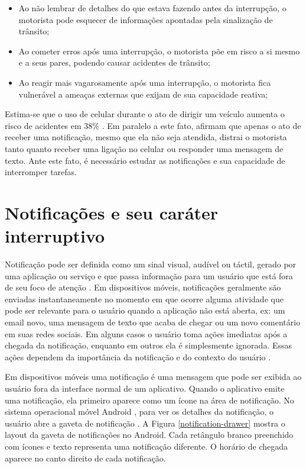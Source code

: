 \begin{itemize}
  \item Ao não lembrar de detalhes do que estava fazendo antes da interrupção, o motorista pode esquecer de informações
  apontadas pela sinalização de trânsito;
  \item Ao cometer erros após uma interrupção, o motorista põe em risco a si mesmo e a seus pares, podendo causar acidentes
  de trânsito;
  \item Ao reagir mais vagarosamente após uma interrupção, o motorista fica vulnerável a ameaças externas que exijam de sua
  capacidade reativa;
\end{itemize}

Estima-se que o uso de celular durante o ato de dirigir um veículo aumenta o risco de acidentes em 38\% \cite{laberge2001wireless}.
Em paralelo a este fato,  afirmam que apenas o ato de receber uma notificação, mesmo que ela não seja
atendida, distrai o motorista tanto quanto receber uma ligação no celular ou responder uma mensagem de texto. Ante este fato, é
necessário estudar as notificações e sua capacidade de interromper tarefas.

\section{Notificações e seu caráter interruptivo}
\label{notificacao}

Notificação pode ser definida como um sinal visual, audível ou táctil, gerado por uma aplicação
ou serviço e que passa informação para um usuário que está fora de seu foco de atenção \cite{iqbal2010notifications}.
Em dispositivos móveis, notificações geralmente são enviadas instantaneamente no momento em que ocorre alguma atividade que pode ser relevante
para o usuário quando a aplicação não está aberta, ex: um email novo, uma mensagem de texto que acaba de chegar ou um
novo comentário em suas redes sociais. Em alguns casos o usuário toma ações imediatas após a chegada da notificação,
enquanto em outros ela é simplesmente ignorada. Essas ações dependem da importância da notificação e do contexto do
usuário \cite{sahami2014large}.

Em dispositivos móveis uma notificação é uma mensagem que pode ser exibida ao usuário fora da interface normal de um aplicativo.
Quando o aplicativo emite uma notificação, ela primeiro aparece como um ícone na área de notificação. No sistema operacional móvel
Android \cite{android}, para ver os detalhes da notificação, o usuário abre a gaveta de notificação \cite{notificationDrawer}. A Figura
\ref{notification-drawer} mostra o layout da gaveta de notificações no Android. Cada retângulo branco preenchido com ícones
e texto representa uma notificação diferente. O horário de chegada aparece no canto direito de cada notificação.

